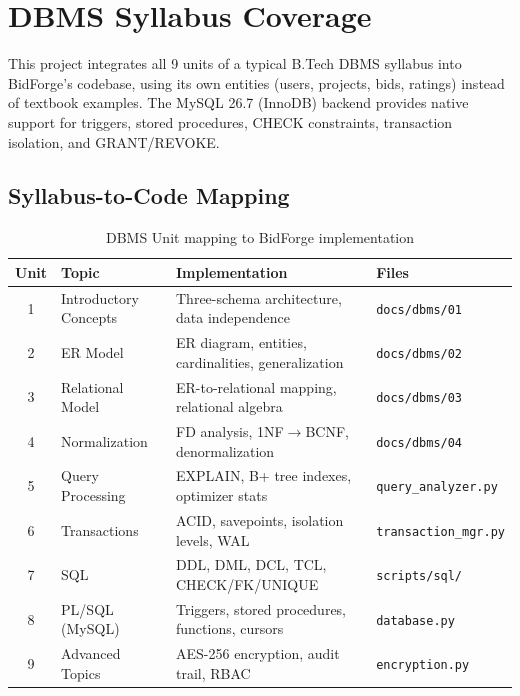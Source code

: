 \documentclass[12pt, a4paper]{report}
\begin{document}
\chapter{DBMS Syllabus Coverage}

This project integrates all 9 units of a typical B.Tech DBMS syllabus into BidForge's codebase, using its own entities (users, projects, bids, ratings) instead of textbook examples. The MySQL 26.7 (InnoDB) backend provides native support for triggers, stored procedures, CHECK constraints, transaction isolation, and GRANT/REVOKE.

\section{Syllabus-to-Code Mapping}

\begin{table}[H]
\centering
\caption{DBMS Unit mapping to BidForge implementation}
\begin{tabular}{@{}clll@{}}
\toprule
\textbf{Unit} & \textbf{Topic} & \textbf{Implementation} & \textbf{Files} \\
\midrule
1 & Introductory Concepts & Three-schema architecture, data independence & \texttt{docs/dbms/01} \\[3pt]
2 & ER Model & ER diagram, entities, cardinalities, generalization & \texttt{docs/dbms/02} \\[3pt]
3 & Relational Model & ER-to-relational mapping, relational algebra & \texttt{docs/dbms/03} \\[3pt]
4 & Normalization & FD analysis, 1NF$\rightarrow$BCNF, denormalization & \texttt{docs/dbms/04} \\[3pt]
5 & Query Processing & EXPLAIN, B+ tree indexes, optimizer stats & \texttt{query\_analyzer.py} \\[3pt]
6 & Transactions & ACID, savepoints, isolation levels, WAL & \texttt{transaction\_mgr.py} \\[3pt]
7 & SQL & DDL, DML, DCL, TCL, CHECK/FK/UNIQUE & \texttt{scripts/sql/} \\[3pt]
8 & PL/SQL (MySQL) & Triggers, stored procedures, functions, cursors & \texttt{database.py} \\[3pt]
9 & Advanced Topics & AES-256 encryption, audit trail, RBAC & \texttt{encryption.py} \\
\bottomrule
\end{tabular}
\end{table}
\end{document}
